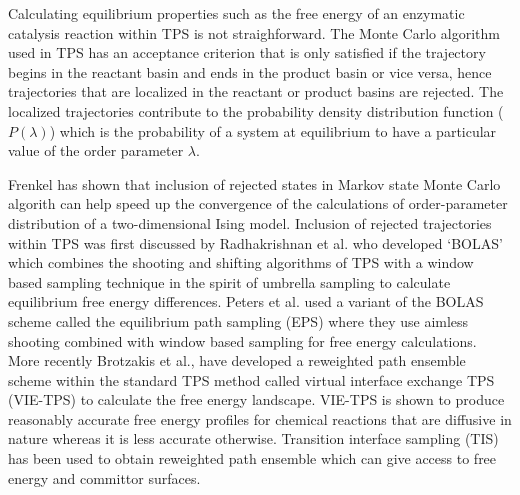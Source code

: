 \documentclass[journal=jpcbfk,manuscript=article,layout=traditional]{achemso}
\begin{document}
Calculating equilibrium properties such as the free energy of an enzymatic 
catalysis reaction within TPS is not straighforward. 
The Monte Carlo algorithm used in TPS has an acceptance criterion that 
is only satisfied if the trajectory begins in the reactant basin and ends in 
the product basin or vice versa, hence trajectories that are localized in the 
reactant or product basins are rejected. The localized trajectories contribute
to the probability density distribution function ($P(\lambda)$) which is the 
probability of a system at equilibrium to have a particular value of the 
order parameter $\lambda$. \cite{Dellago09AdvCompSimAppp167} 

Frenkel has shown that inclusion of rejected states in Markov state Monte 
Carlo algorith can help speed up the convergence of the calculations of 
order-parameter distribution of a two-dimensional
Ising model. \cite{Frenkel04ProcNatAcadSci101p17571}
Inclusion of rejected trajectories within TPS was first discussed by Radhakrishnan 
et al. \cite{Radhakrishnan04JChemPhys121p2436} who developed `BOLAS' which combines 
the shooting and shifting algorithms of TPS with a window based sampling technique 
in the spirit of umbrella sampling to calculate equilibrium free energy 
differences. Peters et al. used a variant of the BOLAS scheme called the 
equilibrium path sampling (EPS) where they use aimless shooting 
combined with window based sampling for free energy calculations. 
\cite{Peters08JAmChemSoc130p17342,Beckham10epsbook} 
More recently Brotzakis et al., \cite{Brotzakis19JChemPhys151p174111}
have developed a reweighted path ensemble scheme within the standard TPS method 
called virtual interface exchange TPS (VIE-TPS) to calculate the free energy 
landscape. VIE-TPS is shown to produce reasonably accurate free energy profiles for 
chemical reactions that are diffusive in nature whereas it is less accurate otherwise.
Transition interface sampling (TIS) has been used to obtain 
reweighted path ensemble which can give access to free energy 
and committor surfaces. \cite{Rogal10JChemPhys17p174109}
\end{document}
